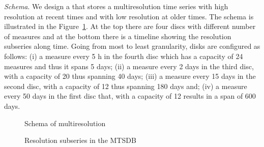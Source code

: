\emph{Schema}. We design a  that stores a multiresolution
time series with high resolution at recent times and with low
resolution at older times. The schema is illustrated in the
Figure~\ref{fig:exemple:window}. At the top there are four discs with
different number of measures and at the bottom there is a timeline
showing the resolution subseries along time. Going from most to least
granularity, disks are configured as follows: (i) a measure every 5 h
in the fourth disc which has a capacity of 24 measures and thus it
spans 5 days; (ii) a measure every 2 days in the third disc, with a
capacity of 20 thus spanning 40 days; (iii) a measure every 15 days in
the second disc, with a capacity of 12 thus spanning 180 days and;
(iv) a measure every 50 days in the first disc that, with a capacity
of 12 results in a span of 600 days.


\begin{figure}[tp]
  \centering
  \setlength{\unitlength}{1.3mm}
  
  \caption{Schema of multiresolution}
  \label{fig:exemple:window}
\end{figure}




\begin{figure}[tp]
  \centering
  
  \caption{Resolution subseries in the MTSDB}
  \label{fig:exemple:4mrd}
\end{figure}






